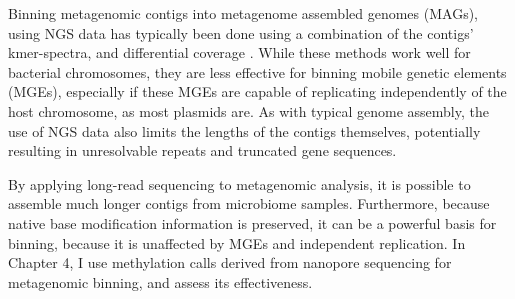 Binning metagenomic contigs into metagenome assembled genomes (MAGs), using NGS data has typically been done using a combination of the contigs’ kmer-spectra, and differential coverage \citep{Ghurye2016-mb}. While these methods work well for bacterial chromosomes, they are less effective for binning mobile genetic elements (MGEs), especially if these MGEs are capable of replicating independently of the host chromosome, as most plasmids are. As with typical genome assembly, the use of NGS data also limits the lengths of the contigs themselves, potentially resulting in unresolvable repeats and truncated gene sequences.

By applying long-read sequencing to metagenomic analysis, it is possible to assemble much longer contigs from microbiome samples. Furthermore, because native base modification information is preserved, it can be a powerful basis for binning, because it is unaffected by MGEs and independent replication. In Chapter 4, I use methylation calls derived from nanopore sequencing for metagenomic binning, and assess its effectiveness.
